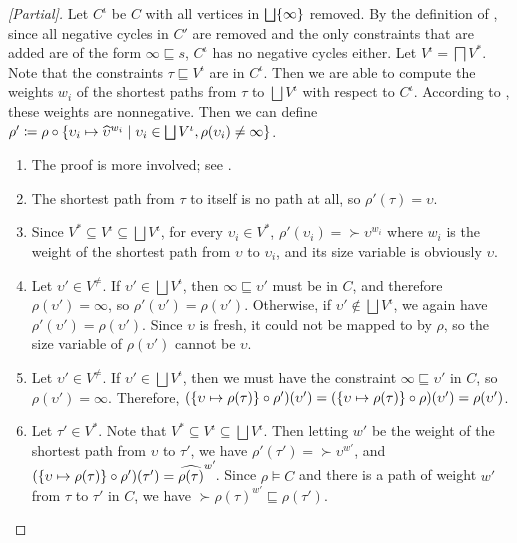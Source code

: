 \begin{proof}[{[Partial]}]
Let $C^\iota$ be $C$ with all vertices in $\bigsqcup \{\infty\}$ removed.
By the definition of \RecCheck, since all negative cycles in $C'$ are removed and the only constraints that are added are of the form $\infty \sqsubseteq s$,
$C^\iota$ has no negative cycles either.
Let $V^\iota = \bigsqcap V^*$.
Note that the constraints $\tau \sqsubseteq V^\iota$ are in $C^\iota$.
Then we are able to compute the weights $w_i$ of the shortest paths from $\tau$ to $\bigsqcup V^\iota$ with respect to $C^\iota$.
According to \citet{f-hat}, these weights are nonnegative.
Then we can define $\rho' \coloneqq \rho \circ \{\upsilon_i \mapsto \widehat{\upsilon}^{w_i} \mid \upsilon_i \in \bigsqcup V^\iota, \rho(\upsilon_i) \neq \infty\}$.

\begin{enumerate}
  \item The proof is more involved; see \citet{f-hat}.
  \item The shortest path from $\tau$ to itself is no path at all, so $\rho'(\tau) = \upsilon$.
  \item Since $V^* \subseteq V^\iota \subseteq \bigsqcup V^\iota$, for every $\upsilon_i \in V^*$, $\rho'(\upsilon_i) = \succ{\upsilon}^{w_i}$ where $w_i$ is the weight of the shortest path from $\upsilon$ to $\upsilon_i$, and its size variable is obviously $\upsilon$.
  \item Let $\upsilon' \in V^\neq$. If $\upsilon' \in \bigsqcup V^\iota$, then $\infty \sqsubseteq \upsilon'$ must be in $C$, and therefore $\rho(\upsilon') = \infty$, so $\rho'(\upsilon') = \rho(\upsilon')$. Otherwise, if $\upsilon' \notin \bigsqcup V^\iota$, we again have $\rho'(\upsilon') = \rho(\upsilon')$. Since $\upsilon$ is fresh, it could not be mapped to by $\rho$, so the size variable of $\rho(\upsilon')$ cannot be $\upsilon$.
  \item Let $\upsilon' \in V^\neq$. If $\upsilon' \in \bigsqcup V^\iota$, then we must have the constraint $\infty \sqsubseteq \upsilon'$ in $C$, so $\rho(\upsilon') = \infty$. Therefore, $(\{\upsilon \mapsto \rho(\tau)\} \circ \rho')(\upsilon') = (\{\upsilon \mapsto \rho(\tau)\} \circ \rho)(\upsilon') = \rho(\upsilon')$.
  \item Let $\tau' \in V^*$. Note that $V^* \subseteq V^\iota \subseteq \bigsqcup V^\iota$.
  Then letting $w'$ be the weight of the shortest path from $\upsilon$ to $\tau'$, we have $\rho'(\tau') = \succ{\upsilon}^{w'}$, and $(\{\upsilon \mapsto \rho(\tau)\} \circ \rho')(\tau') = \widehat{\rho(\tau)}^{w'}\!$.
  Since $\rho \vDash C$ and there is a path of weight $w'$ from $\tau$ to $\tau'$ in $C$,
  we have $\succ{\rho(\tau)}^{w'}\! \sqsubseteq \rho(\tau')$.
\end{enumerate}
\end{proof}

